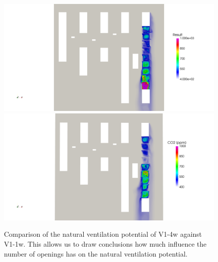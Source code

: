 \begin{figure}[!htbp]
	\includegraphics[width=0.160\textheight, trim= 86.5cm 11.5cm 41cm 15cm, clip]{images/CO2/V1-1w/topview_CO2}
	\includegraphics[width=0.09\textheight, trim= 112cm 5.85cm 19cm 10cm, clip]{images/CO2/V0/topview_CO2}
	\captionsetup{format=plain}
	\caption[Comparison of the  natural ventilation potential of V1-4w against V1-1w]{Comparison of the  natural ventilation potential of V1-4w against V1-1w. This allows us to draw conclusions how much influence the number of openings has on the natural ventilation potential.}
	\label{fig:ACR_V14w_V12w_V11w}
\end{figure}



